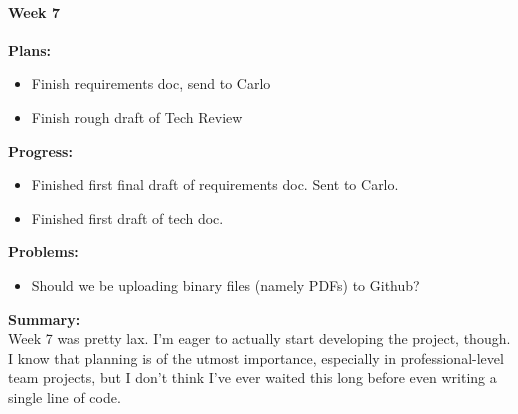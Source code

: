 \paragraph{Week 7}
\begin{adjustwidth}{2.5em}{0pt}
    \vspace{-0.5cm}\textbf{Plans:}
    \vspace{-0.5cm}
    \begin{itemize}
        \item Finish requirements doc, send to Carlo
        \item Finish rough draft of Tech Review
    \end{itemize} 
    \vspace{-0.3cm}\textbf{Progress:}
    \vspace{-0.5cm}
    \begin{itemize}
        \item Finished first final draft of requirements doc. Sent to Carlo.
        \item Finished first draft of tech doc.
    \end{itemize} 
    \vspace{-0.3cm}\textbf{Problems:}
    \vspace{-0.5cm}
    \begin{itemize}
        \item Should we be uploading binary files (namely PDFs) to Github?
    \end{itemize}  
    \vspace{-0.3cm}\noindent\textbf{Summary:}\\
    \noindent 
    Week 7 was pretty lax. I'm eager to actually start developing the project, though. I know that planning is of the utmost importance, especially in professional-level team projects, but I don't think I've ever waited this long before even writing a single line of code.

\end{adjustwidth} 

